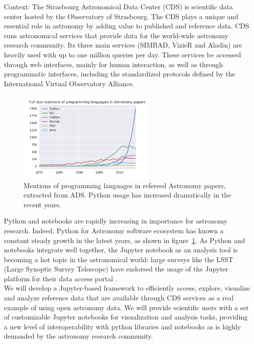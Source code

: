 \begin{task}[
  title=Astronomy application,
  id=astro,
  lead=CDS,
  PM=18,
  wphases={18-42},
  partners={QS,WTT,SRL,INSERM,XFEL}
]

  Context: The Strasbourg Astronomical Data Center (CDS) is scientific data 
  center hosted by the Observatory of Strasbourg. The CDS plays a unique and 
  essential role in astronomy by adding value to published and reference data. 
  CDS runs astronomical services that
  provide data for the world-wide astronomy research community. Its three main
  services (SIMBAD, VizieR and Aladin) are heavily used with up to one million
  queries per day.  These services be accessed through web interfaces, mainly
  for human interaction, as well as through programmatic interfaces, including
  the standardized protocols defined by the International Virtual Observatory
  Alliance.

\begin{figure}[ht!]\centering
  \includegraphics[width=0.6\textwidth]{python-astro-citations}
  \caption{Mentions of programming languages in refereed Astronomy papers, extracted from ADS. Python usage has increased dramatically in the recent years.}\label{fig:python-astro-citations}
\end{figure}

  Python and notebooks are rapidly increasing in importance for astronomy 
  research. Indeed, Python for Astronomy software ecosystem has known a 
  constant steady growth in the latest years, as shown in 
  figure~\ref{fig:python-astro-citations}. As Python and notebooks integrate 
  well together, the Jupyter notebook as an analysis tool is becoming a hot 
  topic in the astronomical world: large surveys like the LSST (Large Synoptic
  Survey Telescope) have endorsed the usage of the Jupyter platform for their 
    data access portal \cite{lsst2017scienceplatform}.\\


  We will develop a Jupyter-based framework to efficiently access, explore,
  visualize and analyze reference data that are available through CDS services 
  as a real example of using open astronomy data.
  We will provide scientific users with a set of customizable Jupyter notebooks
  for visualization and analysis tasks, providing a new level of
  interoperability with python libraries and notebooks as is highly demanded
  by the astronomy research community.


\end{task}
